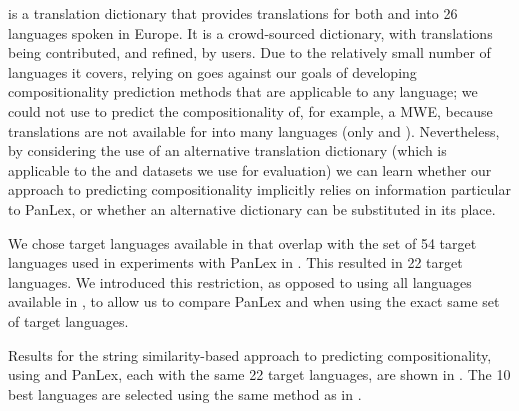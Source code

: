\documentclass[output=paper
,modfonts
,nonflat]{langsci/langscibook}
\begin{document}
\dictcc is a translation dictionary that provides translations for
both  and  into 26 languages spoken in Europe. It is a
crowd-sourced dictionary, with translations being contributed, and
refined, by users. Due to the relatively small number of languages it
covers, relying on \dictcc goes against our goals of developing
compositionality prediction methods that are applicable to any
language; we could not use \dictcc to predict the compositionality of,
for example, a  MWE, because translations are not available for
 into many languages (only  and ). Nevertheless, by
considering the use of an alternative translation dictionary (which is
applicable to the  and  datasets we use for evaluation)
we can learn whether our approach to predicting compositionality
implicitly relies on information particular to PanLex, or whether an
alternative dictionary can be substituted in its place.

We chose target languages available in \dictcc that overlap with the
set of 54 target languages used in experiments with PanLex in
. This resulted in 22 target
languages. We introduced this restriction, as opposed to using all
languages available in \dictcc, to allow us to compare PanLex and
\dictcc when using the exact same set of target languages.

Results for the string similarity-based approach to predicting
compositionality, using \dictcc and PanLex, each with the same 22
target languages, are shown in
. The 10 best languages are
selected using the same method as in .

\end{document}
